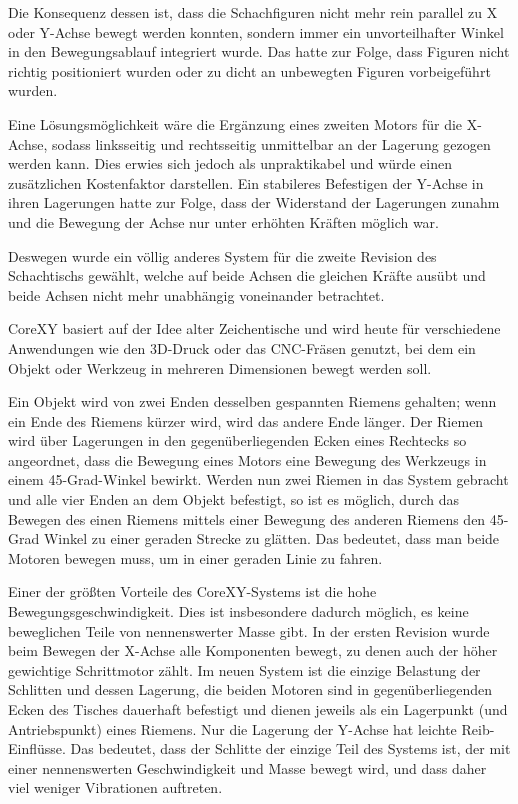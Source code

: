 Die Konsequenz dessen ist, dass die Schachfiguren nicht mehr rein
parallel zu X oder Y-Achse bewegt werden konnten, sondern immer ein
unvorteilhafter Winkel in den Bewegungsablauf integriert wurde. Das
hatte zur Folge, dass Figuren nicht richtig positioniert wurden oder zu
dicht an unbewegten Figuren vorbeigeführt wurden.

Eine Lösungsmöglichkeit wäre die Ergänzung eines zweiten Motors für die
X-Achse, sodass linksseitig und rechtsseitig unmittelbar an der Lagerung
gezogen werden kann. Dies erwies sich jedoch als unpraktikabel und würde
einen zusätzlichen Kostenfaktor darstellen. Ein stabileres Befestigen
der Y-Achse in ihren Lagerungen hatte zur Folge, dass der Widerstand der
Lagerungen zunahm und die Bewegung der Achse nur unter erhöhten Kräften
möglich war.

Deswegen wurde ein völlig anderes System für die zweite Revision des
Schachtischs gewählt, welche auf beide Achsen die gleichen Kräfte ausübt
und beide Achsen nicht mehr unabhängig voneinander betrachtet.

CoreXY basiert auf der Idee alter Zeichentische und wird heute für
verschiedene Anwendungen wie den 3D-Druck oder das CNC-Fräsen genutzt,
bei dem ein Objekt oder Werkzeug in mehreren Dimensionen bewegt werden
soll.

Ein Objekt wird von zwei Enden desselben gespannten Riemens gehalten;
wenn ein Ende des Riemens kürzer wird, wird das andere Ende länger. Der
Riemen wird über Lagerungen in den gegenüberliegenden Ecken eines
Rechtecks so angeordnet, dass die Bewegung eines Motors eine Bewegung
des Werkzeugs in einem 45-Grad-Winkel bewirkt. Werden nun zwei Riemen in
das System gebracht und alle vier Enden an dem Objekt befestigt, so ist
es möglich, durch das Bewegen des einen Riemens mittels einer Bewegung
des anderen Riemens den 45-Grad Winkel zu einer geraden Strecke zu
glätten. Das bedeutet, dass man beide Motoren bewegen muss, um in einer
geraden Linie zu fahren.

Einer der größten Vorteile des CoreXY-Systems ist die hohe
Bewegungsgeschwindigkeit. Dies ist insbesondere dadurch möglich, es
keine beweglichen Teile von nennenswerter Masse gibt. In der ersten
Revision wurde beim Bewegen der X-Achse alle Komponenten bewegt, zu
denen auch der höher gewichtige Schrittmotor zählt. Im neuen System ist
die einzige Belastung der Schlitten und dessen Lagerung, die beiden
Motoren sind in gegenüberliegenden Ecken des Tisches dauerhaft befestigt
und dienen jeweils als ein Lagerpunkt (und Antriebspunkt) eines Riemens.
Nur die Lagerung der Y-Achse hat leichte Reib-Einflüsse. Das bedeutet,
dass der Schlitte der einzige Teil des Systems ist, der mit einer
nennenswerten Geschwindigkeit und Masse bewegt wird, und dass daher viel
weniger Vibrationen auftreten.


